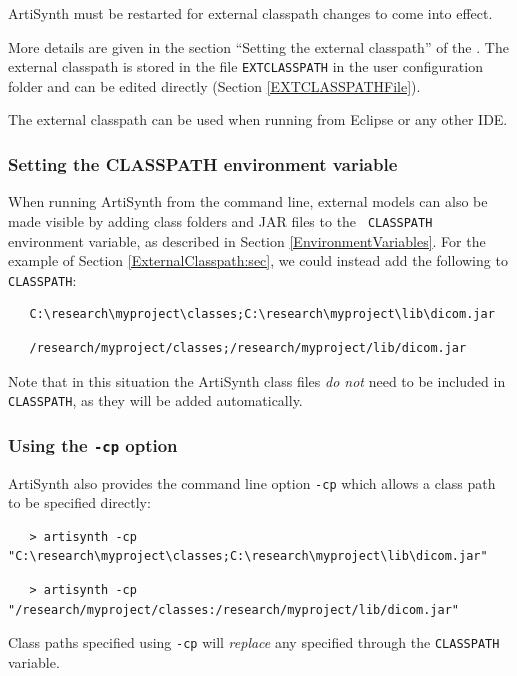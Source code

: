 \begin{sideblock}
ArtiSynth must be restarted for external classpath changes to come
into effect.
\end{sideblock}

More details are given in the section ``Setting the external classpath''
of the 
.
The external classpath is stored in the file {\tt EXTCLASSPATH}
in the user configuration folder and can be edited directly
(Section \ref{EXTCLASSPATHFile}).

The external classpath can be used when running from Eclipse or any
other IDE.

\subsubsection{Setting the CLASSPATH environment variable}
\label{SettingCLASSPATH}

When running ArtiSynth from the command line, external models can also
be made visible by adding class folders and JAR files to the {\tt
CLASSPATH} environment variable, as described in
Section \ref{EnvironmentVariables}. For the example of
Section \ref{ExternalClasspath:sec}, we could instead add the following to
{\tt CLASSPATH}:
\ifWindows
\begin{verbatim}
   C:\research\myproject\classes;C:\research\myproject\lib\dicom.jar
\end{verbatim}
\else
\begin{verbatim}
   /research/myproject/classes;/research/myproject/lib/dicom.jar
\end{verbatim}
\fi
Note that in this situation the ArtiSynth class files {\it do not}
need to be included in {\tt CLASSPATH}, as they will be added
automatically.

\subsubsection{Using the {\tt -cp} option}

ArtiSynth also provides the command line option {\tt -cp} which allows
a class path to be specified directly:
\ifWindows
\begin{verbatim}
   > artisynth -cp "C:\research\myproject\classes;C:\research\myproject\lib\dicom.jar"
\end{verbatim}
\else
\begin{verbatim}
   > artisynth -cp "/research/myproject/classes:/research/myproject/lib/dicom.jar"
\end{verbatim}
\fi
Class paths specified using {\tt -cp} will {\it replace} any specified
through the {\tt CLASSPATH} variable.

